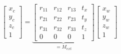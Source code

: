\begin{equation}
    \begin{bmatrix}
        x_c \\ y_c \\ z_c \\ 1
    \end{bmatrix}
    =
    \underbrace{
        \begin{bmatrix}
            r_{11} & r_{12} & r_{13} & t_x \\
            r_{21} & r_{22} & r_{23} & t_y \\
            r_{31} & r_{32} & r_{33} & t_z \\
            0      & 0      & 0      & 1
        \end{bmatrix}
    }_{=M_{ext}}
    \begin{bmatrix}
        x_w \\ y_w \\ z_w \\1
    \end{bmatrix}
\end{equation}
